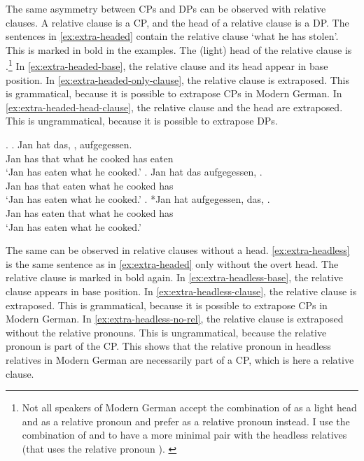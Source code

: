 The same asymmetry between CPs and DPs can be observed with relative clauses. A relative clause is a CP, and the head of a relative clause is a DP. The sentences in \ref{ex:extra-headed} contain the relative clause  `what he has stolen'. This is marked in bold in the examples. The (light) head of the relative clause is .\footnote{
Not all speakers of Modern German accept the combination of  as a light head and  as a relative pronoun and prefer  as a relative pronoun instead. I use the combination of  and  to have a more minimal pair with the headless relatives (that uses the relative pronoun ).
\label{ftn:das-was}
}
In \ref{ex:extra-headed-base}, the relative clause and its head appear in base position. In \ref{ex:extra-headed-only-clause}, the relative clause is extraposed. This is grammatical, because it is possible to extrapose CPs in Modern German. In \ref{ex:extra-headed-head-clause}, the relative clause and the head are extraposed. This is ungrammatical, because it is possible to extrapose DPs.

\ex.\label{ex:extra-headed}
\ag. Jan hat das,    , aufgegessen.\\
Jan has that what he cooked has eaten\\
`Jan has eaten what he cooked.'\label{ex:extra-headed-base}
\bg. Jan hat das aufgegessen,    .\\
Jan has that eaten what he cooked has\\
`Jan has eaten what he cooked.'\label{ex:extra-headed-only-clause}
\cg. *Jan hat aufgegessen, das,    .\\
Jan has eaten that what he cooked has\\
`Jan has eaten what he cooked.'\label{ex:extra-headed-head-clause} 

The same can be observed in relative clauses without a head. \ref{ex:extra-headless} is the same sentence as in \ref{ex:extra-headed} only without the overt head. The relative clause is marked in bold again.
In \ref{ex:extra-headless-base}, the relative clause appears in base position. In \ref{ex:extra-headless-clause}, the relative clause is extraposed. This is grammatical, because it is possible to extrapose CPs in Modern German. In \ref{ex:extra-headless-no-rel}, the relative clause is extraposed without the relative pronouns. This is ungrammatical, because the relative pronoun is part of the CP.
This shows that the relative pronoun in headless relatives in Modern German are necessarily part of a CP, which is here a relative clause.

